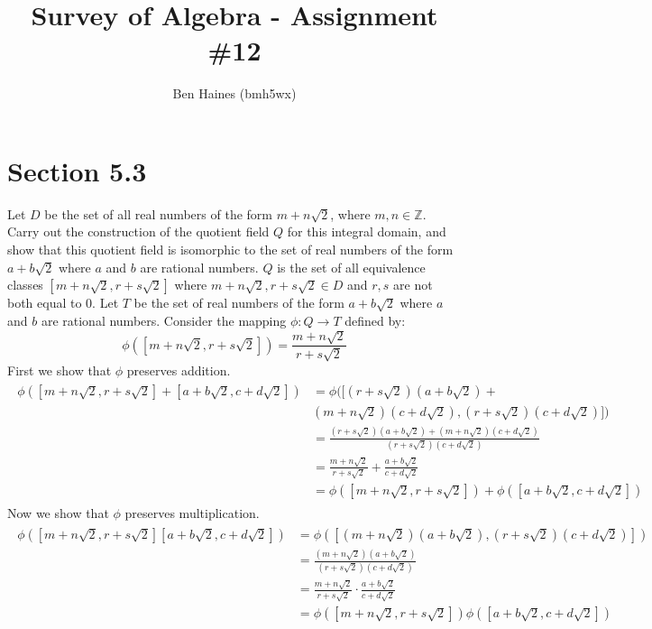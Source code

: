 \documentclass[paper=a4, fontsize=11pt]{jhwhw} %
\begin{document}
\title{Survey of Algebra - Assignment \#12}
\author{Ben Haines (bmh5wx)}
\section*{Section 5.3}
Let $D$ be the set of all real numbers of the form $m+n\sqrt{2}$, where $m, n\in \mathbb Z$. Carry out the construction of the quotient field $Q$ for this integral domain, and show that this quotient field is isomorphic to the set of real numbers of the form $a + b\sqrt{2}$ where $a$ and $b$ are rational numbers.
\solution
$Q$ is the set of all equivalence classes $[m + n\sqrt{2}, r + s\sqrt{2}]$ where $m + n\sqrt{2}, r + s\sqrt{2}\in D$ and $r, s$ are not both equal to 0. Let $T$ be the set of real numbers of the form $a + b\sqrt{2}$ where $a$ and $b$ are rational numbers. Consider the mapping $\phi:Q\to T$ defined by:
$$\phi([m + n\sqrt{2}, r + s\sqrt{2}]) = \frac{m + n\sqrt{2}}{r + s\sqrt{2}}$$
First we show that $\phi$ preserves addition.
\begin{align}
    \begin{split}
        \phi([m + n\sqrt{2}, r + s\sqrt{2}] + [a + b\sqrt{2}, c + d\sqrt{2}]) &= \phi([(r + s\sqrt{2})(a + b\sqrt{2}) + \\
                                                                              &(m+n\sqrt{2})(c + d\sqrt{2}), (r + s\sqrt{2})(c + d\sqrt{2})])\\
                                                                              &= \frac{(r + s\sqrt{2})(a + b\sqrt{2}) + (m + n\sqrt{2})(c + d\sqrt{2})}{(r + s\sqrt{2})(c + d\sqrt{2})}\\
                                                                              &= \frac{m + n\sqrt{2}}{r + s\sqrt{2}} + \frac{a + b\sqrt{2}}{c + d\sqrt{2}}\\
                                                                              &= \phi([m + n\sqrt{2}, r + s\sqrt{2}]) + \phi([a + b\sqrt{2}, c + d\sqrt{2}])
    \end{split}
\end{align}
Now we show that $\phi$ preserves multiplication.
\begin{align}
    \begin{split}
        \phi([m + n\sqrt{2}, r + s\sqrt{2}][a + b\sqrt{2}, c + d\sqrt{2}]) &= \phi([(m + n\sqrt{2})(a + b\sqrt{2}), (r + s\sqrt{2})(c + d\sqrt{2})])\\
                                                                           &= \frac{(m + n\sqrt{2})(a + b\sqrt{2})}{(r + s\sqrt{2})(c + d\sqrt{2})}\\
                                                                           &= \frac{m + n\sqrt{2}}{r + s\sqrt{2}}\cdot \frac{a + b\sqrt{2}}{c + d\sqrt{2}}\\
                                                                           &= \phi([m + n\sqrt{2}, r + s\sqrt{2}])\phi([a + b\sqrt{2}, c + d\sqrt{2}])
    \end{split}
\end{align}
\end{document}
